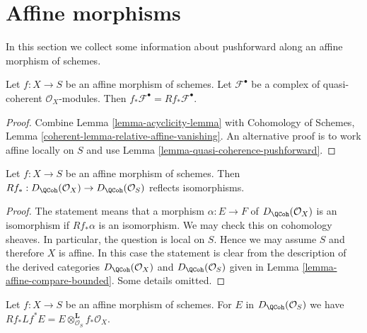\section{Affine morphisms}
\label{section-affine-morphisms}

\noindent
In this section we collect some information about pushforward
along an affine morphism of schemes.

\begin{lemma}
\label{lemma-pushforward-affine-morphism}
Let $f : X \to S$ be an affine morphism of schemes. Let $\mathcal{F}^\bullet$
be a complex of quasi-coherent $\mathcal{O}_X$-modules. Then
$f_*\mathcal{F}^\bullet = Rf_*\mathcal{F}^\bullet$.
\end{lemma}

\begin{proof}
Combine Lemma \ref{lemma-acyclicity-lemma} with
Cohomology of Schemes, Lemma \ref{coherent-lemma-relative-affine-vanishing}.
An alternative proof is to work affine locally on $S$
and use Lemma \ref{lemma-quasi-coherence-pushforward}.
\end{proof}

\begin{lemma}
\label{lemma-affine-morphism}
Let $f : X \to S$ be an affine morphism of schemes.
Then
$Rf_* : D_\QCoh(\mathcal{O}_X) \to D_\QCoh(\mathcal{O}_S)$
reflects isomorphisms.
\end{lemma}

\begin{proof}
The statement means that a morphism $\alpha : E \to F$ of
$D_\QCoh(\mathcal{O}_X)$ is an isomorphism if
$Rf_*\alpha$ is an isomorphism. We may check this on cohomology sheaves.
In particular, the question is local on $S$. Hence we may assume $S$
and therefore $X$ is affine. In this case the statement is clear from
the description of the derived categories
$D_\QCoh(\mathcal{O}_X)$ and
$D_\QCoh(\mathcal{O}_S)$ given in
Lemma \ref{lemma-affine-compare-bounded}.
Some details omitted.
\end{proof}

\begin{lemma}
\label{lemma-affine-morphism-pull-push}
Let $f : X \to S$ be an affine morphism of schemes.
For $E$ in $D_\QCoh(\mathcal{O}_S)$ we have
$Rf_* Lf^* E = E \otimes^\mathbf{L}_{\mathcal{O}_S} f_*\mathcal{O}_X$.
\end{lemma}

